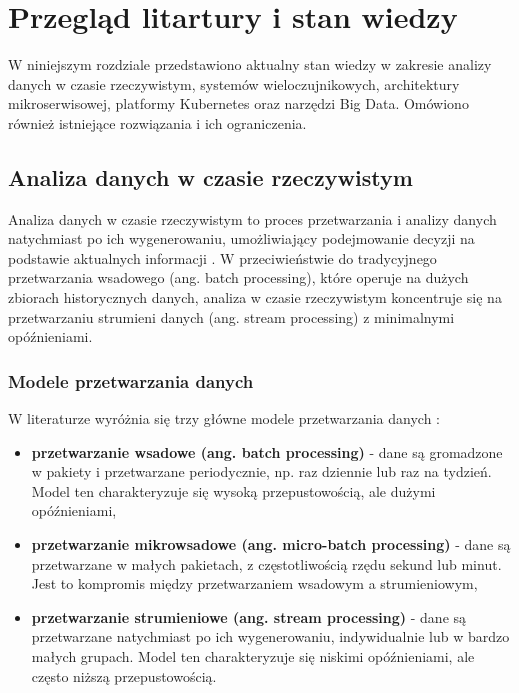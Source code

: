 \section{Przegląd litartury i stan wiedzy}
\label{sec:przeglad_literatury}

W niniejszym rozdziale przedstawiono aktualny stan wiedzy w zakresie analizy danych w czasie rzeczywistym, systemów wieloczujnikowych,
architektury mikroserwisowej, platformy Kubernetes oraz narzędzi Big Data. Omówiono również istniejące rozwiązania i ich ograniczenia.

\subsection{Analiza danych w czasie rzeczywistym}
\label{subsec:analiza_danych}

Analiza danych w czasie rzeczywistym to proces przetwarzania i analizy danych natychmiast po ich wygenerowaniu,
umożliwiający podejmowanie decyzji na podstawie aktualnych informacji \cite{realtime_analytics}. W przeciwieństwie do tradycyjnego przetwarzania
wsadowego (ang. batch processing), które operuje na dużych zbiorach historycznych danych, analiza w czasie rzeczywistym koncentruje się na przetwarzaniu
strumieni danych (ang. stream processing) z minimalnymi opóźnieniami.

\subsubsection{Modele przetwarzania danych}
\label{subsubsec:modele_przetwarzania}

W literaturze wyróżnia się trzy główne modele przetwarzania danych \cite{data_processing_models}:

\begin{itemize}
    \item \textbf{przetwarzanie wsadowe (ang. batch processing)} - dane są gromadzone w pakiety i przetwarzane periodycznie, np. raz dziennie lub raz na tydzień. Model ten charakteryzuje się wysoką przepustowością, ale dużymi opóźnieniami,
    \item \textbf{przetwarzanie mikrowsadowe (ang. micro-batch processing)} - dane są przetwarzane w małych pakietach, z częstotliwością rzędu sekund lub minut. Jest to kompromis między przetwarzaniem wsadowym a strumieniowym,
    \item \textbf{przetwarzanie strumieniowe (ang. stream processing)} - dane są przetwarzane natychmiast po ich wygenerowaniu, indywidualnie lub w bardzo małych grupach. Model ten charakteryzuje się niskimi opóźnieniami, ale często niższą przepustowością.
\end{itemize}

